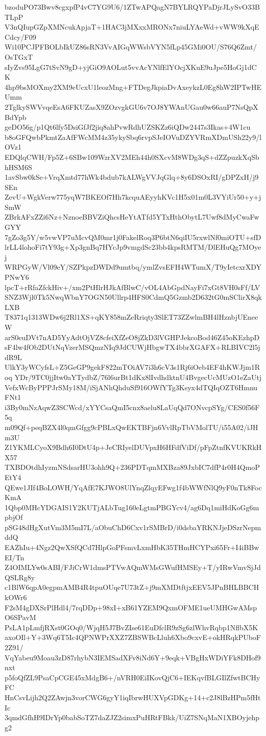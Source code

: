 bzoduPO73Bwv8cgxpfP4vC7YG9U6/1ZTwAPQagN7BYLRQYPaDjrJLySvO33BTLpP
V3nQIupGZpXMNcukApjaT+1HAC3jMXxxMRONx7niuLYAeWd+vWW9kXqECdcy/F09
Wi10PCJPFBOLbIkUZ86sRN3VvAIGqWWsbVYN5fLp45GMi0OU/S76Q6Zmt/OsTGxT
sIyZvs95LgG7tSvN9gD+yjGiO9AOLut5vvAcYNlfElYOcjXKuE9uJpe5HoGj1dCK
4hp9bsMOXmy2XM9eUcxU1leozMng+FTDegJkpiaDvAxeykzL0Eg8hW2IPTwHEUmm
2TglkySWVvqeEsA6FKUZasX9ZOzvgkGU6v7OJ8YWAnUGau0w66auP7NsQpXBdYpb
geDO56g/p1Qt6lfy5DsiGfJf2jiq8ahPvwRdhUZSKZz6iQDw2447s3Ikas+4W1cu
b8oGFQwbPkmtZaAfFWcMM4z35ykySbq6rvpSJeIOVuDZYVRmXDmUSh22y9/lOVz1
EDQlqCWH/Fp5Z+6SBw109WzrXV2MEh44h0SXcvM8WDg3qS+dZZpuzkXqSbhHSM6S
1avSbw0kSe+VrqXmtd77hWk4bdub7kALWgVVJqGlq+8y6DSOxRI/gDPZxH/j9SEn
ZevU+WgkVerw775yqW7BKEOf7Hh7kcquAEyyhKVc1H5x01m0L3VYiUr50+y+jSmW
ZBrkAFxZZi6Nz+NznoeBBVZiQhcsHeYtATfd5YTxHthObytL7Uwf8dMyCwaFwGYY
7gZo3g5Y/w5vwVP7uMcvQM0mr1j0FakelRoq3P6btN6qiIU5rxwlNf0miOTU+sfD
lrLL4lohoFi7tY93g+Xp3gnBq7HYcJp9vmgdSc23bb4kpsRMTM/DlEHuQg7MOyej
WRPGyW/Vl09eY/SZPkpzDWDd9umtbq/ymlZvsEFH4WTumX/T9yIetcxrXDYPNwY6
lpcT+rRfaZfckHiv+/xm2PtHlrHJkAfBlwC/vOL4AbGpdNayFi7xGt8VH0sFf/LV
SNZ3Wjl0Tk5NwqWbnY7OGN50Ullrp4HFS0CdmQ5Gzmb2D632tG0mSClirX8qkLXB
T8371q1313WDw6j2Rl1XS+qKY858mZeRriqty3SlET73ZZwlmBH4lHznbjUEneeW
arS0euDVt7nAD5YyAdtOjVZ8cfeiXfZeO8jZkD3lVGHPJekcoBod46Z45oKEzhpD
sF4lw4fOb2DUtNqVzerMSQmzNIq9JdCUWjHbgwTX4bbrXGAFX+RLBIVC2l5jdR9L
UlkY3yWCyfsL+Z5GeGP9gekF822mTOiAV7i3h6cV3s1Rj6iOeb4EF4hKWJjm1Roq
YDr/9TC0jjItw0aYTydbZ/76l6urBt1dKx8lIvdhdktnU4BvgecUcMUzO1eZaUtj
VefxWcByPPPJrSMy18M/iSjANhQhduSf916OWfYTg3Ksyx4dTQIqOZT6HmnuFNt1
i3By0mNzAqwZ3SCWcd/xYYCsaQmI5cnx8aelu8LaUqQd7ONvcpSYg/CES0f56F5q
m09Qf+peqBZX4l0qmGfgg9cPBLxQwEKTBFjn6VvlRpTbVMolTU/i55A02/iJHm3U
Z1YKMLCyoX9Bdh6I0DtU4p+JeCRIyelDUVpxH6HFdfViDf/pFpZtnfKVUKRkHX57
TXBDOtdhIyzmNSdsarHU3ohh9Q+236PDTqmMXBza89JxbIC7dfP4r0H4QmoPEtY4
QEwe1JIf4BoLOWH/YqAfE7KJWO8UlYnqZlqyEFwg1f4bWWfNlQ9yF0nTk8FocKmA
1Qbp0MHcYDGAIS1Y2KUTjALbTug160eLgtmPBGYcv4/ag6Dq1miHdKoGg6mpbjOf
pSG48dHgXutVm3M5mI7L/aObuChD6Cxv1rSMBrD/i0dsbaYRKNJjeDSzrNepmddQ
EAZhIu+4Ngz2QwXSfQCd7HlpGoPFsmvLxmHbK35THmHCYPxi65Fr+I4iBBwEI/Tn
Z4OIMLYw0sABI/FJiCrW1dmsPTVwAQmWMsGWufHMSEy+T/yIRwVmvSjJdQSLRg8y
c1BlW6qpA0egpmAMB4R4tpuOUqe7U73tZ+j9mXMDtftjxEEV5JPnBHLBBCHkOWr6
F2sM4gDXSrPlHdl4/7rqDDp+98xI+xB61YZEM9QxmOFME1ueUMHGwAMspO6SPavM
PsLA1pLmfjRXst0GOq0/WjqH5J7BvZIse61EuDfclR9zSg6zlWhvRqbp1NflbX5K
axoOIl+Y+3Wq6T5Ic4QPNWPrXXZ7ZBSWBcLluh6Xbo9cxvE+okHRqkPUboF2Z91/
VqYabeu9Moau3zD87rhybN3IEMSadXFv8iNd6Y+9eqk+VBgHxWDiYFk8DHof9nxt
p5foQfZL9PsaCpCGE45xMdgB6+/nVRH0EiIKovQjC6+IEKqvfBLGIlZfwtBCHyFC
HnCsvLijh2Q2ZAwjn3vorCWG6gyY1iqIbrwHUXVpGDKg+14+c2J8lBzHPm5fHtIc
3qmdGfhH9IDrYp0babSoTZ7daZJZ2simxPuHRtFBkk/UiZ7SNqMaN1XBOyjehpg2
